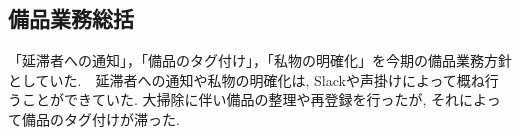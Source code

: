 \subsection*{備品業務総括}

「延滞者への通知」，「備品のタグ付け」，「私物の明確化」を今期の備品業務方針としていた.　延滞者への通知や私物の明確化は, Slackや声掛けによって概ね行うことができていた.  大掃除に伴い備品の整理や再登録を行ったが, それによって備品のタグ付けが滞った.


